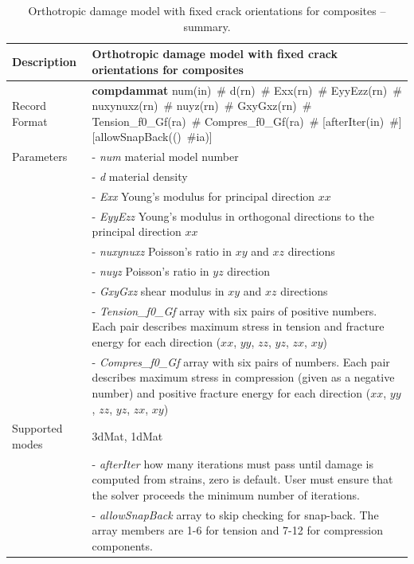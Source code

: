 \documentclass[a4paper]{article}
\newcommand{\descitem}[1]{{\noindent \bf #1}}
\newcommand{\elemparam}[2]{{{#1\tiny (#2)}~\#}}
\newcommand{\param}[1]{{\it #1}}
\begin{document}
\begin{table}[!htb]
\begin{tabular}{|l|p{9cm}|}
\hline
Description & Orthotropic damage model with fixed crack orientations for composites\\
\hline
Record Format & \descitem{compdammat}  \elemparam{num}{in}
\elemparam{d}{rn} \elemparam{Exx}{rn} \elemparam{EyyEzz}{rn}
\elemparam{nuxynuxz}{rn} \elemparam{nuyz}{rn} \elemparam{GxyGxz}{rn}
\elemparam{Tension\_f0\_Gf}{ra} \elemparam{Compres\_f0\_Gf}{ra} [\elemparam{afterIter}{in}] [\elemparam{allowSnapBack}(ia)]\\
Parameters
&- \param{num} material model number\\
&- \param{d} material density\\
&- \param{Exx} Young's modulus for principal direction $xx$\\
&- \param{EyyEzz} Young's modulus in orthogonal directions to the principal direction $xx$\\
&- \param{nuxynuxz} Poisson's ratio in $xy$ and $xz$ directions\\
&- \param{nuyz} Poisson's ratio in $yz$ direction\\
&- \param{GxyGxz} shear modulus in $xy$ and $xz$ directions\\
&- \param{Tension\_f0\_Gf} array with six pairs of positive numbers. Each pair describes maximum stress in tension and fracture energy for each direction ($xx$, $yy$, $zz$, $yz$, $zx$, $xy$)\\
&- \param{Compres\_f0\_Gf} array with six pairs of numbers. Each pair describes maximum stress in compression (given as a negative number) and positive fracture energy for each direction ($xx$, $yy$, $zz$, $yz$, $zx$, $xy$)\\
Supported modes& 3dMat, 1dMat\\
&- \param {afterIter} how many iterations must pass until damage is computed from strains, zero is default. User must ensure that the solver proceeds the minimum number of iterations.\\
&- \param {allowSnapBack} array to skip checking for snap-back. The array members are 1-6 for tension and 7-12 for compression components.\\
\hline
\end{tabular}
\caption{Orthotropic damage model with fixed crack orientations for composites -- summary.}
\label{compdammat_table}
\end{table}
\end{document}
